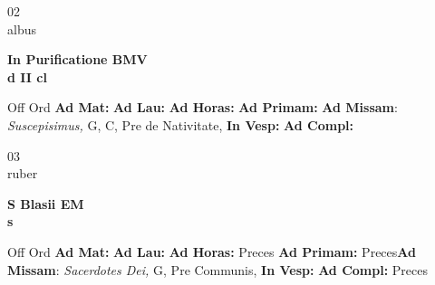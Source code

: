 \documentclass[10pt, openany]{book}
\begin{document}
    \begin{center}
        \begin{minipage}{3.5in}
            \vspace{2em}
            \begin{minipage}{0.5in}
                {\Huge 02} \\
                {\normalsize albus}
            \end{minipage}
            \begin{minipage}{3.0in}
                \textbf{ \large In Purificatione BMV \\
                \textnormal{\normalsize d II cl}}

            \end{minipage}
            \begin{justify}Off Ord
                \textbf{Ad Mat: }
                \textbf{Ad Lau: }
                \textbf{Ad Horas: }
                \textbf{Ad Primam: }\textbf{Ad Missam}: \textit{Suscepisimus,} G, C, Pre de Nativitate, 
                \textbf{In Vesp: }
                \textbf{Ad Compl: }
            \end{justify}
        \end{minipage}
    \end{center}

    \begin{center}
        \begin{minipage}{3.5in}
            \vspace{2em}
            \begin{minipage}{0.5in}
                {\Huge 03} \\
                {\normalsize ruber}
            \end{minipage}
            \begin{minipage}{3.0in}
                \textbf{ \large S Blasii EM \\
                \textnormal{\normalsize s}}

            \end{minipage}
            \begin{justify}Off Ord
                \textbf{Ad Mat: }
                \textbf{Ad Lau: }
                \textbf{Ad Horas: }Preces
                \textbf{Ad Primam: }Preces\textbf{Ad Missam}: \textit{Sacerdotes Dei,} G, Pre Communis, 
                \textbf{In Vesp: }
                \textbf{Ad Compl: }Preces
            \end{justify}
        \end{minipage}
    \end{center}
\end{document}

